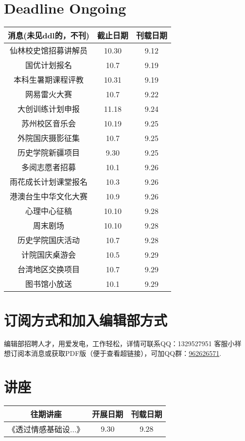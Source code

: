 \documentclass[letterpaper, 12pt]{article}
\begin{document}
\begin{multicols}{2}

\section{Deadline Ongoing}
\begin{tabular}{|c|c|c|}
    \hline
    消息(未见ddl的，不刊) & 截止日期 & 刊载日期\\
    \hline\hline
    仙林校史馆招募讲解员 & 10.30 & 9.12\\
    国优计划报名 & 10.7 & 9.19\\
    本科生暑期课程评教 & 10.31 & 9.19\\
    网易雷火大赛 & 10.7 & 9.22\\
    大创训练计划申报 & 11.18 & 9.24\\
    苏州校区音乐会 & 10.19 & 9.25\\
    外院国庆摄影征集 & 10.7 & 9.25\\
    历史学院新疆项目 & 9.30 & 9.25\\
    多阅志愿者招募 & 10.1 & 9.26\\
    雨花成长计划课堂报名 & 10.3 & 9.26\\
    港澳台生中华文化大赛 & 10.9 & 9.26\\
    心理中心征稿 & 10.10 & 9.28\\
    周末剧场 & 10.10 & 9.28\\
    历史学院国庆活动 & 10.7 & 9.28\\
    计院国庆桌游会 & 10.5 & 9.29\\
    台湾地区交换项目 & 10.7 & 9.29\\
    图书馆小放送 & 10.1 & 9.29\\
    \hline
\end{tabular}
\section{订阅方式和加入编辑部方式}
编辑部招聘人才，用爱发电，工作轻松，详情可联系QQ：1329527951 客服小祥\\想订阅本消息或获取PDF版（便于查看超链接），可加QQ群：\href{https://qm.qq.com/q/FGX1VYCrGS}{962626571}.
\section{讲座}
\begin{tabular}{|c|c|c|}
    \hline
    往期讲座 & 开展日期 & 刊载日期\\
    \hline\hline
    《透过情感基础设...》 & 9.30 & 9.28\\
      \hline
\end{tabular}\\\\

\end{multicols}
\end{document}
